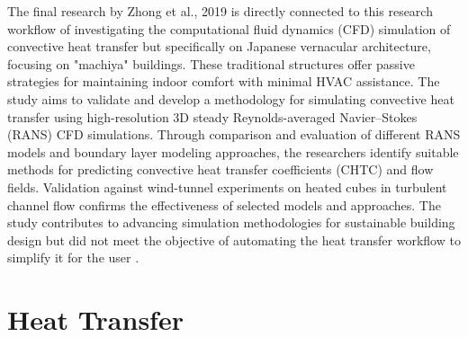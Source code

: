 The final research by Zhong et al., 2019 \cite{litrev2} is directly connected to this research workflow of investigating the computational fluid dynamics (CFD) simulation of convective heat transfer but specifically on Japanese vernacular architecture, focusing on "machiya" buildings. These traditional structures offer passive strategies for maintaining indoor comfort with minimal HVAC assistance. The study aims to validate and develop a methodology for simulating convective heat transfer using high-resolution 3D steady Reynolds-averaged Navier–Stokes (RANS) CFD simulations. Through comparison and evaluation of different RANS models and boundary layer modeling approaches, the researchers identify suitable methods for predicting convective heat transfer coefficients (CHTC) and flow fields. Validation against wind-tunnel experiments on heated cubes in turbulent channel flow confirms the effectiveness of selected models and approaches. The study contributes to advancing simulation methodologies for sustainable building design but did not meet the objective of automating the heat transfer workflow to simplify it for the user \cite{litrev2}. 








\section{Heat Transfer}

